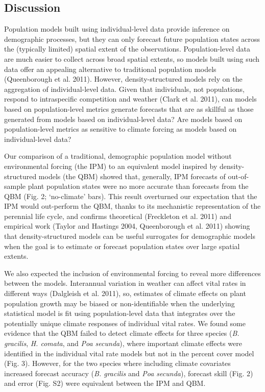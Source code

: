 \documentclass[12pt,]{article}
\begin{document}
\subsection{Discussion}\label{discussion}

Population models built using individual-level data provide inference on
demographic processes, but they can only forecast future population
states across the (typically limited) spatial extent of the
observations. Population-level data are much easier to collect across
broad spatial extents, so models built using such data offer an
appealing alternative to traditional population models (Queenborough et
al. 2011). However, density-structured models rely on the aggregation of
individual-level data. Given that individuals, not populations, respond
to intraspecific competition and weather (Clark et al. 2011), can models
based on population-level metrics generate forecasts that are as
skillful as those generated from models based on individual-level data?
Are models based on population-level metrics as sensitive to climate
forcing as models based on individual-level data?

Our comparison of a traditional, demographic population model without
environmental forcing (the IPM) to an equivalent model inspired by
density-structured models (the QBM) showed that, generally, IPM
forecasts of out-of-sample plant population states were no more accurate
than forecasts from the QBM (Fig. 2; `no-climate' bars). This result
overturned our expectation that the IPM would out-perform the QBM,
thanks to its mechanistic representation of the perennial life cycle,
and confirms theoretical (Freckleton et al. 2011) and empirical work
(Taylor and Hastings 2004, Queenborough et al. 2011) showing that
density-structured models can be useful surrogates for demographic
models when the goal is to estimate or forecast population states over
large spatial extents.

We also expected the inclusion of environmental forcing to reveal more
differences between the models. Interannual variation in weather can
affect vital rates in different ways (Dalgleish et al. 2011), so,
estimates of climate effects on plant population growth may be biased or
non-identifiable when the underlying statistical model is fit using
population-level data that integrates over the potentially unique
climate responses of individual vital rates. We found some evidence that
the QBM failed to detect climate effects for three species (\emph{B.
gracilis}, \emph{H. comata}, and \emph{Poa secunda}), where important
climate effects were identified in the individual vital rate models but
not in the percent cover model (Fig. 3). However, for the two species
where including climate covariates increased forecast accuracy (\emph{B.
gracilis} and \emph{Poa secunda}), forecast skill (Fig. 2) and error
(Fig. S2) were equivalent between the IPM and QBM.
\end{document}

